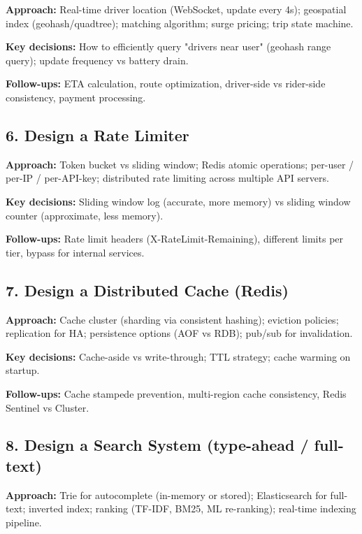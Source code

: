 \documentclass[11pt]{article}
\begin{document}
\textbf{Approach:} Real-time driver location (WebSocket, update every 4s); geospatial index (geohash/quadtree); matching algorithm; surge pricing; trip state machine.

\textbf{Key decisions:} How to efficiently query "drivers near user" (geohash range query); update frequency vs battery drain.

\textbf{Follow-ups:} ETA calculation, route optimization, driver-side vs rider-side consistency, payment processing.

\subsection{6. Design a Rate Limiter}\label{6-design-a-rate-limiter}

\textbf{Approach:} Token bucket vs sliding window; Redis atomic operations; per-user / per-IP / per-API-key; distributed rate limiting across multiple API servers.

\textbf{Key decisions:} Sliding window log (accurate, more memory) vs sliding window counter (approximate, less memory).

\textbf{Follow-ups:} Rate limit headers (X-RateLimit-Remaining), different limits per tier, bypass for internal services.

\subsection{7. Design a Distributed Cache (Redis)}\label{7-design-a-distributed-cache-redis}

\textbf{Approach:} Cache cluster (sharding via consistent hashing); eviction policies; replication for HA; persistence options (AOF vs RDB); pub/sub for invalidation.

\textbf{Key decisions:} Cache-aside vs write-through; TTL strategy; cache warming on startup.

\textbf{Follow-ups:} Cache stampede prevention, multi-region cache consistency, Redis Sentinel vs Cluster.

\subsection{8. Design a Search System (type-ahead / full-text)}\label{8-design-a-search-system-type-ahead--full-text}

\textbf{Approach:} Trie for autocomplete (in-memory or stored); Elasticsearch for full-text; inverted index; ranking (TF-IDF, BM25, ML re-ranking); real-time indexing pipeline.
\end{document}

